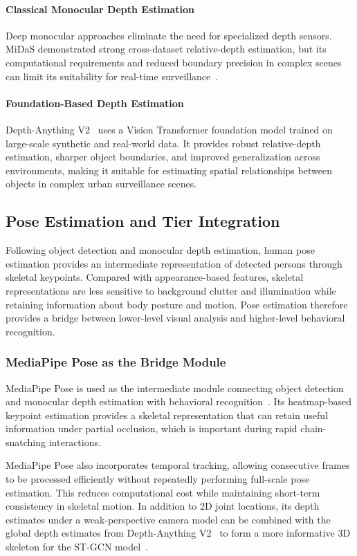 \documentclass[runningheads]{llncs}
\begin{document}
\paragraph{Classical Monocular Depth Estimation}
Deep monocular approaches eliminate the need for specialized depth sensors. MiDaS demonstrated strong cross-dataset relative-depth estimation, but its computational requirements and reduced boundary precision in complex scenes can limit its suitability for real-time surveillance~\cite{monovit}.

\paragraph{Foundation-Based Depth Estimation}
Depth-Anything V2~\cite{yang2024depth} uses a Vision Transformer foundation model trained on large-scale synthetic and real-world data. It provides robust relative-depth estimation, sharper object boundaries, and improved generalization across environments, making it suitable for estimating spatial relationships between objects in complex urban surveillance scenes.


\subsection{Pose Estimation and Tier Integration}

Following object detection and monocular depth estimation, human pose estimation provides an intermediate representation of detected persons through skeletal keypoints. Compared with appearance-based features, skeletal representations are less sensitive to background clutter and illumination while retaining information about body posture and motion. Pose estimation therefore provides a bridge between lower-level visual analysis and higher-level behavioral recognition.

\subsubsection{MediaPipe Pose as the Bridge Module}

MediaPipe Pose is used as the intermediate module connecting object detection and monocular depth estimation with behavioral recognition~\cite{mediapipe}. Its heatmap-based keypoint estimation provides a skeletal representation that can retain useful information under partial occlusion, which is important during rapid chain-snatching interactions.

MediaPipe Pose also incorporates temporal tracking, allowing consecutive frames to be processed efficiently without repeatedly performing full-scale pose estimation. This reduces computational cost while maintaining short-term consistency in skeletal motion. In addition to 2D joint locations, its depth estimates under a weak-perspective camera model can be combined with the global depth estimates from Depth-Anything V2~\cite{yang2024depth} to form a more informative 3D skeleton for the ST-GCN model~\cite{yan2018stgcn}.
\end{document}
